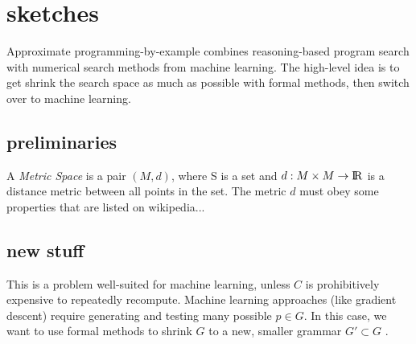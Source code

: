\section{sketches}

Approximate programming-by-example combines reasoning-based program search with numerical search methods from machine learning.
The high-level idea is to get shrink the search space as much as possible with formal methods, then switch over to machine learning.


\subsection{preliminaries}
A \textit{Metric Space} is a pair $(M,d)$, where S is a set and $d:M \times M \to {\rm I\!R}$ is a distance metric between all points in the set. The metric $d$ must obey some properties that are listed on wikipedia...

\iffalse
I think I dont need this actually
A product metric $(X^{*},d_p)$ is a metric space over the Cartesian product of finitely many metric spaces $(X_0,d_0),...,(X_n,d_n)$,
  where $d_p:X^n \times X^n \to \reals$ also obey those properties.
If $d_p$ is a norm ``which is non-decreasing as the coordinates of a positive n-tuple increase``\footnote{took this from \url{https://en.wikipedia.org/wiki/Metric_space#Product_metric_spaces}, not sure how to formalize it yet}, then then topology of the X^* is equivelant
\fi

\subsection{new stuff}

This is a problem well-suited for machine learning, unless $C$ is prohibitively expensive to repeatedly recompute.
Machine learning approaches (like gradient descent) require generating and testing many possible $p \in G$.
In this case, we want to use formal methods to shrink $G$ to a new, smaller grammar $G' \subset G$ .

